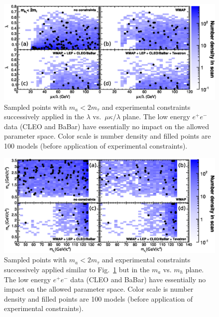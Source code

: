 \documentclass[aps,prl,twocolumn,nofootinbib,superscriptaddress]{revtex4}
\begin{document}
\begin{figure}[htb]
\includegraphics[width=0.87\linewidth]{fourconstraints_params}
\caption{Sampled points with $m_a < 2m_\tau$ and experimental constraints successively applied 
in the $\lambda$ vs.\ $\mu\kappa/\lambda$ plane. The low energy $e^+e^-$ data (CLEO and
BaBar) have essentially no impact on the allowed parameter space. Color scale is number density 
and filled points are 100 models (before application of experimental 
constraints). \label{fig:exclusion_params}}
\end{figure}
\begin{figure}[hbt]
\includegraphics[width=0.87\linewidth]{fourconstraints_masses}
\caption{Sampled points with $m_a < 2m_\tau$ and experimental constraints successively applied 
similar to Fig.~\ref{fig:exclusion_params} but in the $m_a$ vs. $m_h$ plane.  The low 
energy $e^+e^-$ data (CLEO and BaBar) have essentially no impact on the allowed parameter space. 
Color scale is number density and filled points are 100 models (before application of experimental 
constraints). \label{fig:exclusion_mass}}
\end{figure}
\end{document}
